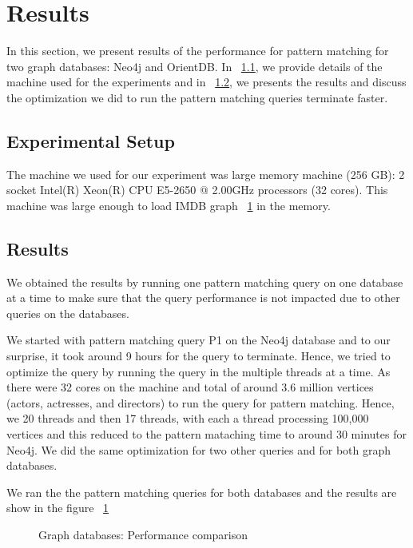 
\section{Results}
In this section, we present results of the performance for pattern matching for two graph databases: Neo4j and OrientDB. In ~\ref{setup}, we provide details of the machine used for the experiments and in ~\ref{result}, we presents the results and discuss the optimization we did to run the pattern matching queries terminate faster.

\subsection{Experimental Setup}
\label{setup}

The machine we used for our experiment was large memory machine (256 GB): 2 socket Intel(R) Xeon(R) CPU E5-2650 @ 2.00GHz processors (32 cores). This machine was large enough to load IMDB graph ~\ref{} in the memory.

\subsection{Results}
\label{result}
We obtained the results by running one pattern matching query on one database at a time to make sure that the query performance is not impacted due to other queries on the databases.

We started with pattern matching query P1 on the Neo4j database and to our surprise, it took around 9 hours for the query to terminate. Hence, we tried to optimize the query by running the query in the multiple threads at a time. As there were 32 cores on the machine and total of around 3.6 million vertices (actors, actresses, and directors) to run the query for pattern matching. Hence, we 20 threads and then 17 threads, with each a thread processing 100,000 vertices and this reduced to the pattern mataching time to around 30 minutes for Neo4j. We did the same optimization for two other queries and for both graph databases.

We ran the the pattern matching queries for both databases and the results are show in the figure ~\ref{fig:comparsion}

\begin{figure}[h!]
	\centering
	\caption{Graph databases: Performance comparison}
	\label{fig:comparsion}
	\centering
\end{figure}

